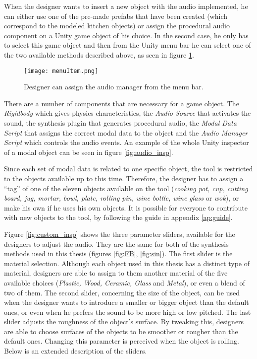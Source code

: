 When the designer wants to insert a new object with the audio implemented, he can either use one of the pre-made prefabs that have been created (which correspond to the modeled kitchen objects) or assign the procedural audio component on a Unity\textsuperscript{\textregistered} game object of his choice. In the second case, he only has to select this game object and then from the Unity\textsuperscript{\textregistered} menu bar he can select one of the two available methods described above, as seen in figure \ref{fig:menu_item}.

\begin{figure}[H]
  \centering
    \texttt{[image: menuItem.png]}
      \caption{Designer can assign the audio manager from the menu bar.}
      \label{fig:menu_item}
\end{figure}

There are a number of components that are necessary for a game object. The \textit{Rigidbody} which gives physics characteristics, the \textit{Audio Source} that activates the sound, the synthesis plugin that generates  procedural audio, the \textit{Modal Data Script} that assigns the correct modal data to the object and the \textit{Audio Manager Script} which controls the audio events. An example of the whole Unity\textsuperscript{\textregistered} inspector of a modal object can be seen in figure \ref{fig:audio_insp}.

Since each set of modal data is related to one specific object, the tool is restricted to the objects available up to this time. Therefore, the designer has to assign a ``tag'' of one of the eleven objects available on the tool (\textit{cooking pot, cup, cutting board, jug, mortar, bowl, plate, rolling pin, wine bottle, wine glass} or \textit{wok}), or make his own if he uses his own objects. It is possible for everyone to contribute with new objects to the tool, by following the guide in appendix \ref{ap:guide}.

Figure \ref{fig:custom_insp} shows the three parameter sliders, available for the designers to adjust the audio. They are the same for both of the synthesis methods  used in this thesis (figures \ref{fig:FB}, \ref{fig:sin}). The first slider is the material selection. Although each object used in this thesis has a distinct type of material, designers are able to assign to them another material of the five available choices (\textit{Plastic, Wood, Ceramic, Glass} and \textit{Metal}), or even a blend of two of them. The second slider, concerning the size of the object, can be used when the designer wants to introduce a smaller or bigger object than the default ones, or even when he prefers the sound to be more high or low pitched. The last slider adjusts the roughness of the object's surface. By tweaking this, designers are able to choose surfaces of the objects to be smoother or rougher than the default ones. Changing this parameter is perceived when the object is rolling. Below is an extended description of the sliders.

